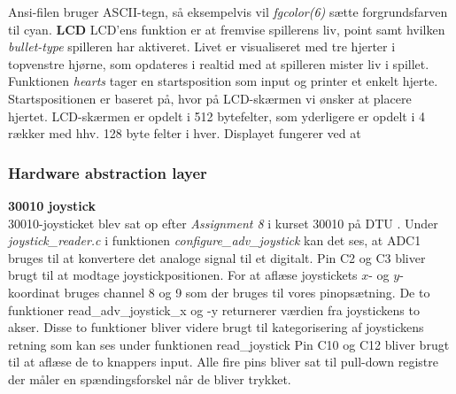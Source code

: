 Ansi-filen bruger ASCII-tegn, så eksempelvis vil \textit{fgcolor(6)} sætte forgrundsfarven til cyan.
\newline
\textbf{LCD}
\newline
LCD'ens funktion er at fremvise spillerens liv, point samt hvilken \textit{bullet-type} spilleren har aktiveret. Livet er visualiseret med tre hjerter i topvenstre hjørne, som opdateres i realtid med at spilleren mister liv i spillet. Funktionen \textit{hearts} tager en startsposition som input og printer et enkelt hjerte. Startspositionen er baseret på, hvor på LCD-skærmen vi ønsker at placere hjertet. LCD-skærmen er opdelt i 512 bytefelter, som yderligere er opdelt i 4 rækker med hhv. 128 byte felter i hver.  Displayet fungerer ved at 


\subsubsection{Hardware abstraction layer}

\textbf{30010 joystick}\\
30010-joysticket blev sat op efter \textit{Assignment 8} i kurset 30010 på DTU \cite{lecture_notes_uge_2}. Under \textit{joystick\_reader.c} i funktionen\textit{ configure\_adv\_joystick} kan det ses, at ADC1 bruges til at konvertere det analoge signal til et digitalt. Pin C2 og C3 bliver brugt til at modtage joystickpositionen. For at aflæse joystickets \(x\)- og \(y\)-koordinat bruges channel 8 og 9 som der bruges til vores pinopsætning\cite{Reference_Manual_RM0365}. De to funktioner read\_adv\_joystick\_x og -y returnerer værdien fra joystickens to akser. Disse to funktioner bliver videre brugt til kategorisering af joystickens retning som kan ses under funktionen read\_joystick Pin C10 og C12 bliver brugt til at aflæse de to knappers input. Alle fire pins bliver sat til pull-down registre der måler en spændingsforskel når de bliver trykket.